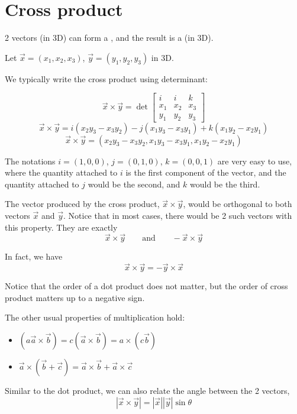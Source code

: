 \documentclass[11pt,fleqn]{book} %
\begin{document}
\section{Cross product}

2 vectors (in 3D) can form a , and the result is a  (in 3D).

Let $\vec{x} = (x_1, x_2, x_3)$, $\vec{y} = (y_1, y_2, y_3)$ in 3D.

We typically write the cross product using determinant:

$$\vec{x} \times \vec{y} = \det \begin{bmatrix} i & i & k \\ x_1 & x_2 & x_3 \\ y_1 & y_2 & y_3 \end{bmatrix}$$ $$\vec{x} \times \vec{y} = i(x_2y_3 - x_3y_2) - j(x_1y_3 - x_3y_1) + k(x_1y_2 - x_2y_1)$$ $$\vec{x} \times \vec{y} = (x_2y_3 - x_3y_2, x_1y_3 - x_3y_1, x_1y_2 - x_2y_1)$$

The notations $i = (1, 0, 0)$, $j = (0, 1, 0)$, $k = (0, 0, 1)$ are very easy to use, where the quantity attached to $i$ is the first component of the vector, and the quantity attached to $j$ would be the second, and $k$ would be the third.

The vector produced by the cross product, $\vec{x} \times \vec{y}$, would be orthogonal to both vectors $\vec{x}$ and $\vec{y}$. Notice that in most cases, there would be 2 such vectors with this property. They are exactly $$\vec{x} \times \vec{y} \qquad\text{and}\qquad -\vec{x} \times \vec{y}$$

In fact, we have $$\vec{x} \times \vec{y} = - \vec{y} \times \vec{x}$$

Notice that the order of a dot product does not matter, but the order of cross product matters up to a negative sign.

The other usual properties of multiplication hold:

\begin{itemize}
    \item $(a\vec{a} \times \vec{b}) = c(\vec{a} \times \vec{b}) = a \times (c\vec{b})$
    \item $\vec{a} \times (\vec{b} + \vec{c}) = \vec{a} \times \vec{b} + \vec{a} \times \vec{c}$
\end{itemize}

Similar to the dot product, we can also relate the angle between the 2 vectors, $$| \vec{x} \times \vec{y} | = | \vec{x} | | \vec{y} | \sin \theta$$
\end{document}

